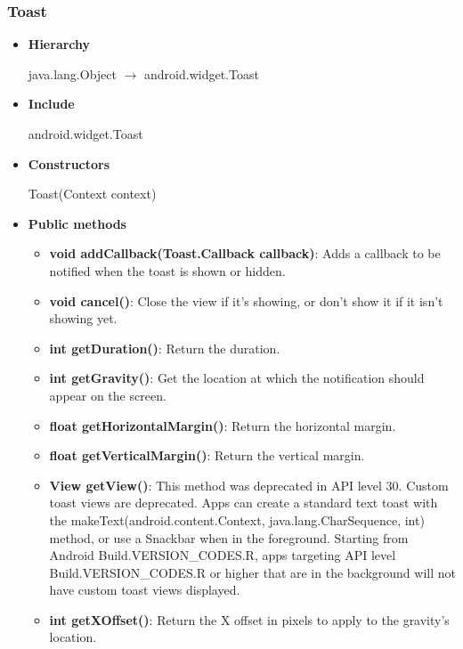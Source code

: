 \documentclass{report}
\begin{document}
\begin{itemize}
    \subsubsection{Toast}
    \begin{itemize}
        \item \textbf{Hierarchy}
            \begin{center}
                java.lang.Object $\to $	android.widget.Toast
            \end{center}
        \item \textbf{Include}
            \bigbreak \noindent 
            \begin{javacode}
                android.widget.Toast
            \end{javacode}
        \item \textbf{Constructors}
            \bigbreak \noindent 
            \begin{javacode}
                Toast(Context context)
            \end{javacode}
        \item \textbf{Public methods}
            \begin{itemize}
                \item \textbf{void	addCallback(Toast.Callback callback)}: Adds a callback to be notified when the toast is shown or hidden.
                \item \textbf{void	cancel()}: Close the view if it's showing, or don't show it if it isn't showing yet.
                \item \textbf{int	getDuration()}: Return the duration.
                \item \textbf{int	getGravity()}: Get the location at which the notification should appear on the screen.
                \item \textbf{float	getHorizontalMargin()}: Return the horizontal margin.
                \item \textbf{float	getVerticalMargin()}: Return the vertical margin.
                \item \textbf{View	getView()}: This method was deprecated in API level 30. Custom toast views are deprecated. Apps can create a standard text toast with the makeText(android.content.Context, java.lang.CharSequence, int) method, or use a Snackbar when in the foreground. Starting from Android Build.VERSION\_CODES.R, apps targeting API level Build.VERSION\_CODES.R or higher that are in the background will not have custom toast views displayed.
                \item \textbf{int	getXOffset()}: Return the X offset in pixels to apply to the gravity's location.

\end{itemize}
\end{itemize}
\end{itemize}
\end{document}
